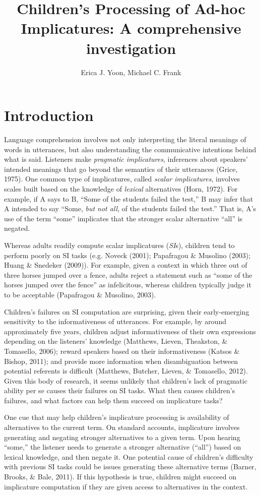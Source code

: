 \documentclass[a4paper,man,apacite,floatsintext]{apa6}
\date{}
\title{\textbf{Children's Processing of Ad-hoc Implicatures: A comprehensive
investigation}}
\author{Erica J. Yoon, Michael C. Frank}
\affiliation{Department of Psychology, Stanford University}
\begin{document}
\maketitle

\section{Introduction}\label{introduction}

Language comprehension involves not only interpreting the literal
meanings of words in utterances, but also understanding the
communicative intentions behind what is said. Listeners make
\emph{pragmatic implicatures}, inferences about speakers' intended
meanings that go beyond the semantics of their utterances (Grice, 1975).
One common type of implicatures, called \emph{scalar implicatures},
involves scales built based on the knowledge of \emph{lexical}
alternatives (Horn, 1972). For example, if A says to B, ``Some of the
students failed the test,'' B may infer that A intended to say ``Some,
\emph{but not all}, of the students failed the test.'' That is, A's use
of the term ``some'' implicates that the stronger scalar alternative
``all'' is negated.

Whereas adults readily compute scalar implicatures (\emph{SI}s),
children tend to perform poorly on SI tasks (e.g. Noveck (2001);
Papafragou \& Musolino (2003); Huang \& Snedeker (2009)). For example,
given a context in which three out of three horses jumped over a fence,
adults reject a statement such as ``some of the horses jumped over the
fence'' as infelicitous, whereas children typically judge it to be
acceptable (Papafragou \& Musolino, 2003).

Children's failures on SI computation are surprising, given their
early-emerging sensitivity to the informativeness of utterances. For
example, by around approximately five years, children adjust
informativeness of their own expressions depending on the listeners'
knowledge (Matthews, Lieven, Theakston, \& Tomasello, 2006); reward
speakers based on their informativeness (Katsos \& Bishop, 2011); and
provide more information when disambiguation between potential referents
is difficult (Matthews, Butcher, Lieven, \& Tomasello, 2012). Given this
body of research, it seems unlikely that children's lack of pragmatic
ability per se causes their failures on SI tasks. What then causes
children's failures, and what factors can help them succeed on
implicature tasks?

One cue that may help children's implicature processing is availability
of alternatives to the current term. On standard accounts, implicature
involves generating and negating stronger alternatives to a given term.
Upon hearing ``some,'' the listener needs to generate a stronger
alternative (``all'') based on lexical knowledge, and then negate it.
One potential cause of children's difficulty with previous SI tasks
could be issues generating these alternative terms (Barner, Brooks, \&
Bale, 2011). If this hypothesis is true, children might succeed on
implicature computation if they are given access to alternatives in the
context.
\end{document}
